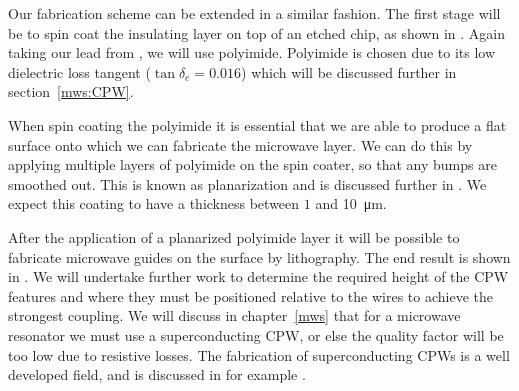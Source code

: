 Our fabrication scheme can be extended in a similar fashion. The first stage
will be to spin coat the insulating layer on top of an etched chip, as shown in
. Again taking our lead from
, we will use polyimide. Polyimide is chosen due to
its low dielectric loss tangent ($\tan\delta_e = 0.016$) which will be
discussed further in section~\ref{mws:CPW}.

When spin coating the polyimide it is essential that we are able to produce a
flat surface onto which we can fabricate the microwave layer. We can do this by
applying multiple layers of polyimide on the spin coater, so that any bumps are
smoothed out. This is known as planarization and is discussed further in
. We expect this coating to have a thickness between $1$
and \SI{10}{\micro\meter}.

After the application of a planarized polyimide layer it will be possible to
fabricate microwave guides on the surface by lithography. The end result is
shown in . We will undertake further work to
determine the required height of the CPW features and where they must be
positioned relative to the wires to achieve the strongest coupling. We will
discuss in chapter~\ref{mws} that for a microwave resonator we must use
a superconducting CPW, or else the quality factor will be too low due to
resistive losses. The fabrication of superconducting CPWs is a well developed
field, and is discussed in for example .
